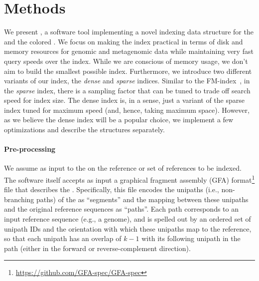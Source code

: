   \section{Methods}\label{sec:methods}
  We present \pufferfish, a software tool implementing a novel indexing data structure for
  the \ccdbg and the colored \ccdbg. We focus on making the \ccdbg index practical
  in terms of disk and memory resources for genomic and metagenomic data while
  maintaining very fast query speeds over the index. While we are conscious of
  memory usage, we don't aim to build the smallest possible index. Furthermore, we
  introduce two different variants of our index, the \emph{dense} and
  \emph{sparse} \pufferfish indices. Similar to the
  FM-index~\citep{Ferragina2001Experimental}, in the \emph{sparse} \pufferfish index,
  there is a sampling factor that can be tuned to trade off search speed for index size. The
  dense index is, in a sense, just a variant of the sparse index tuned for maximum speed (and, hence, taking
  maximum space). However, as we believe the dense index will be a popular choice,
  we implement a few optimizations and describe the structures separately.

  \paragraph*{Pre-processing} We assume as input to \pufferfish the \ccdbg on the reference
  or set of references to be indexed. The \pufferfish software itself accepts as
  input a graphical fragment assembly (GFA) format\footnote{\url{https://github.com/GFA-spec/GFA-spec}} file that describes
  the \ccdbg. Specifically, this file encodes the unipaths (i.e., non-branching
  paths) of the \ccdbg as ``segments'' and the mapping between these unipaths and
  the original reference sequences as ``paths''. Each path corresponds to an
  input reference sequence (e.g., a genome), and is spelled out by an ordered set
  of unipath IDs and the orientation with which these unipaths map to the
  reference, so that each unipath has an overlap of $k-1$ with its following
  unipath in the path (either in the forward or reverse-complement direction).

